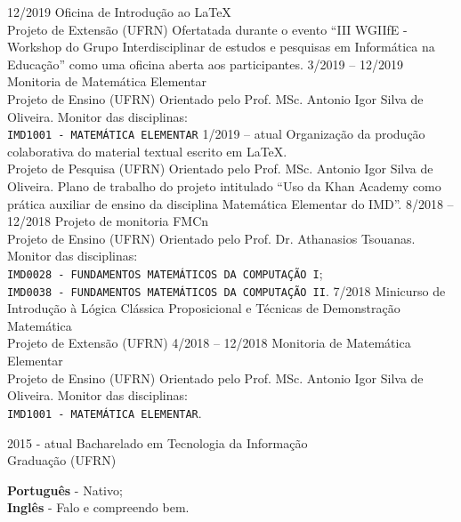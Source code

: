 \documentclass[9pt]{developercv}
\begin{document}
	\begin{entrylist}
		\entry
			{12/2019}
			{Oficina de Introdução ao \LaTeX{}\\
				\footnotesize{{Projeto de Extensão}}}
			{(UFRN)}
			{Ofertatada durante o evento ``III WGIIfE - Workshop do Grupo Interdisciplinar de estudos e pesquisas em Informática na Educação'' como uma oficina aberta aos participantes.}
		\entry
			{3/2019 -- 12/2019}
			{Monitoria de Matemática Elementar\\
				\footnotesize{Projeto de Ensino}}
			{(UFRN)}
			{Orientado pelo Prof. MSc. Antonio Igor Silva de Oliveira. Monitor das disciplinas:\\
				\texttt{IMD1001 - MATEMÁTICA ELEMENTAR}}
		\entry
			{1/2019 -- atual}
			{Organização da produção colaborativa do material textual escrito em \LaTeX{}.\\
				\footnotesize{Projeto de Pesquisa}}
			{(UFRN)}
			{Orientado pelo Prof. MSc. Antonio Igor Silva de Oliveira. Plano de trabalho do projeto intitulado ``Uso da Khan Academy como prática auxiliar de ensino da disciplina Matemática Elementar do IMD''.}
		\entry
			{8/2018 -- 12/2018}
			{Projeto de monitoria FMCn\\
				\footnotesize{Projeto de Ensino}}
			{(UFRN)}
			{Orientado pelo Prof. Dr. Athanasios Tsouanas. Monitor das disciplinas:\\
				\texttt{IMD0028 - FUNDAMENTOS MATEMÁTICOS DA COMPUTAÇÃO I};\\
				\texttt{IMD0038 - FUNDAMENTOS MATEMÁTICOS DA COMPUTAÇÃO II}.}
		\entry
			{7/2018}
			{Minicurso de Introdução à Lógica Clássica Proposicional e Técnicas de Demonstração Matemática\\
				\footnotesize{{Projeto de Extensão}}}
			{(UFRN)}
			{}
		\entry
			{4/2018 -- 12/2018}
			{Monitoria de Matemática Elementar\\
				\footnotesize{Projeto de Ensino}}
			{(UFRN)}
			{Orientado pelo Prof. MSc. Antonio Igor Silva de Oliveira. Monitor das disciplinas:\\
				\texttt{IMD1001 - MATEMÁTICA ELEMENTAR}.}
	\end{entrylist}


	\cvsect{Formação Acadêmica}
	\begin{entrylist}
		\entry
			{2015 - atual}
			{Bacharelado em Tecnologia da Informação\\
				\footnotesize{Graduação}}
			{(UFRN)}
			{}
	\end{entrylist}


	\begin{minipage}[t]{1\textwidth}
		\textbf{Português} - Nativo;\\
		\textbf{Inglês} - Falo e compreendo bem.
	\end{minipage}
\end{document}
